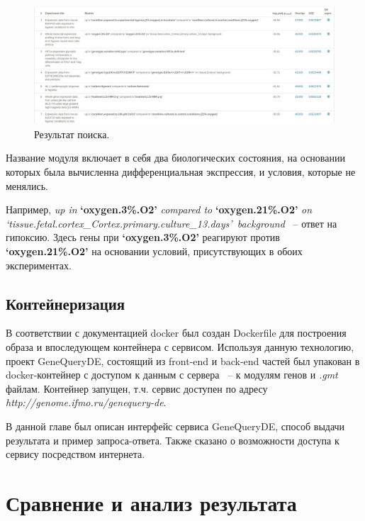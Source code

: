 \documentclass[times,specification,annotation]{itmo-student-thesis}
\begin{document}
\begin{figure}[!h]
    \caption{Результат поиска.}\label{clientResponse}
    \centering
    \includegraphics[width=1\textwidth]{response.jpg}
\end{figure}

Название модуля включает в себя два биологических состояния, на основании которых была вычисленна дифференциальная экспрессия, и условия, которые не менялись.

Например, \textit{up in} \textbf{\lq oxygen.3\%.O2\rq } \textit{compared to} \textbf{\lq oxygen.21\%.O2\rq} \textit{on \lq tissue.fetal.cortex\_Cortex.primary.culture\_13.days\rq~background} ~-- ответ на гипоксию. Здесь гены при \textbf{\lq oxygen.3\%.O2\rq} реагируют против \textbf{\lq oxygen.21\%.O2\rq} на основании условий, присутствующих в обоих экспериментах. 

\section{Контейнеризация}

В соответствии с документацией docker\cite{Docker} был создан Dockerfile для построения образа и впоследующем контейнера с сервисом. Используя данную технологию, проект GeneQueryDE, состоящий из front-end и back-end частей был упакован в docker-контейнер с доступом к данным с сервера ~-- к модулям генов и \textit{.gmt} файлам. Контейнер запущен, т.ч. сервис доступен по адресу \textit{http://genome.ifmo.ru/genequery-de}.  

\chapterconclusion

В данной главе был описан интерфейс сервиса GeneQueryDE, способ выдачи результата и пример запроса-ответа. Также сказано о возможности доступа к сервису посредством интернета. 

\chapter{Сравнение и анализ результата}
\end{document}
